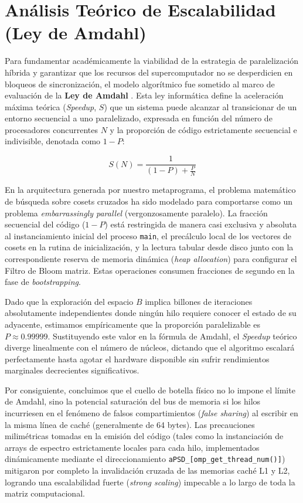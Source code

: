 \documentclass[12pt,a4paper]{tfg_domingo}
\begin{document}
\section{Análisis Teórico de Escalabilidad (Ley de Amdahl)}

Para fundamentar académicamente la viabilidad de la estrategia de
paralelización híbrida y garantizar que los recursos del
supercomputador no se desperdicien en bloqueos de sincronización, el
modelo algorítmico fue sometido al marco de evaluación de la
\textbf{Ley de Amdahl} \cite{amdahl1967validity}. Esta ley informática
define la aceleración máxima teórica (\emph{Speedup}, $S$) que un
sistema puede alcanzar al transicionar de un entorno secuencial a uno
paralelizado, expresada en función del número de procesadores
concurrentes $N$ y la proporción de código estrictamente secuencial e
indivisible, denotada como $1-P$: 

$$S(N) = \frac{1}{(1 - P) + \frac{P}{N}}$$

En la arquitectura generada por nuestro metaprograma, el problema
matemático de búsqueda sobre cosets cruzados ha sido modelado para
comportarse como un problema \emph{embarrassingly parallel}
(vergonzosamente paralelo). La fracción secuencial del código ($1-P$)
está restringida de manera casi exclusiva y absoluta al
instanciamiento inicial del proceso \texttt{main}, el precálculo local
de los vectores de cosets en la rutina de inicialización, y la lectura
tabular desde disco junto con la correspondiente reserva de memoria
dinámica (\emph{heap allocation}) para configurar el Filtro de Bloom
matriz. Estas operaciones consumen fracciones de segundo en la fase de
\emph{bootstrapping}. 

Dado que la exploración del espacio $B$ implica billones de
iteraciones absolutamente independientes donde ningún hilo requiere
conocer el estado de su adyacente, estimamos empíricamente que la
proporción paralelizable es $P \approx 0.99999$. Sustituyendo este valor en
la fórmula de Amdahl, el \emph{Speedup} teórico diverge linealmente
con el número de núcleos, dictando que el algoritmo escalará
perfectamente hasta agotar el hardware disponible sin sufrir
rendimientos marginales decrecientes significativos. 

Por consiguiente, concluimos que el cuello de botella físico no lo
impone el límite de Amdahl, sino la potencial saturación del bus de
memoria si los hilos incurriesen en el fenómeno de falsos
compartimientos (\emph{false sharing}) al escribir en la misma línea
de caché (generalmente de 64 bytes). Las precauciones milimétricas
tomadas en la emisión del código (tales como la instanciación de
arrays de espectro estrictamente locales para cada hilo, implementados
dinámicamente mediante el direccionamiento
\texttt{aPSD\_[omp\_get\_thread\_num()]}) mitigaron por completo la
invalidación cruzada de las memorias caché L1 y L2, logrando una
escalabilidad fuerte (\emph{strong scaling}) impecable a lo largo de
toda la matriz computacional. 
\end{document}
